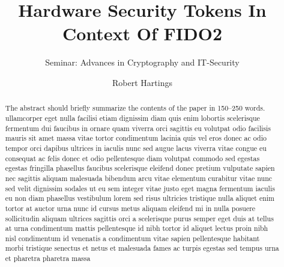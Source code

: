 \documentclass[runningheads]{llncs}
\begin{document}
%
\title{Hardware Security Tokens In Context Of FIDO2}
\subtitle{Seminar: Advances in Cryptography and IT-Security}
%
%

\author{Robert Hartings}

%
\maketitle              %
%
\begin{abstract}
The abstract should briefly summarize the contents of the paper in
150--250 words. ullamcorper eget nulla facilisi etiam dignissim diam quis enim lobortis scelerisque fermentum dui faucibus in ornare quam viverra orci sagittis eu volutpat odio facilisis mauris sit amet massa vitae tortor condimentum lacinia quis vel eros donec ac odio tempor orci dapibus ultrices in iaculis nunc sed augue lacus viverra vitae congue eu consequat ac felis donec et odio pellentesque diam volutpat commodo sed egestas egestas fringilla phasellus faucibus scelerisque eleifend donec pretium vulputate sapien nec sagittis aliquam malesuada bibendum arcu vitae elementum curabitur vitae nunc sed velit dignissim sodales ut eu sem integer vitae justo eget magna fermentum iaculis eu non diam phasellus vestibulum lorem sed risus ultricies tristique nulla aliquet enim tortor at auctor urna nunc id cursus metus aliquam eleifend mi in nulla posuere sollicitudin aliquam ultrices sagittis orci a scelerisque purus semper eget duis at tellus at urna condimentum mattis pellentesque id nibh tortor id aliquet lectus proin nibh nisl condimentum id venenatis a condimentum vitae sapien pellentesque habitant morbi tristique senectus et netus et malesuada fames ac turpis egestas sed tempus urna et pharetra pharetra massa

\end{abstract}
%
%
%
\end{document}
